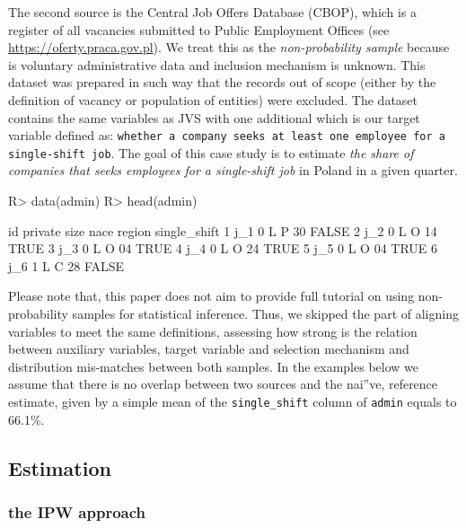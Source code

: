 \documentclass[
]{jss}
\begin{document}
The second source is the Central Job Offers Database (CBOP), which is a
register of all vacancies submitted to Public Employment Offices (see
\url{https://oferty.praca.gov.pl}). We treat this as the
\textit{non-probability sample} because is voluntary administrative data
and inclusion mechanism is unknown. This dataset was prepared in such
way that the records out of scope (either by the definition of vacancy
or population of entities) were excluded. The dataset contains the same
variables as JVS with one additional  which is our
target variable defined as:
\texttt{whether a company seeks at least one employee for a single-shift job}.
The goal of this case study is to estimate
\textit{the share of companies that seeks employees for a single-shift job}
in Poland in a given quarter.

\begin{CodeChunk}
\begin{CodeInput}
R> data(admin)
R> head(admin)
\end{CodeInput}
\begin{CodeOutput}
   id private size nace region single_shift
1 j_1       0    L    P     30        FALSE
2 j_2       0    L    O     14         TRUE
3 j_3       0    L    O     04         TRUE
4 j_4       0    L    O     24         TRUE
5 j_5       0    L    O     04         TRUE
6 j_6       1    L    C     28        FALSE
\end{CodeOutput}
\end{CodeChunk}

Please note that, this paper does not aim to provide full tutorial on
using non-probability samples for statistical inference. Thus, we
skipped the part of aligning variables to meet the same definitions,
assessing how strong is the relation between auxiliary variables, target
variable and selection mechanism and distribution mis-matches between
both samples. In the examples below we assume that there is no overlap
between two sources and the nai''ve, reference estimate, given by a
simple mean of the \texttt{single\_shift} column of \texttt{admin}
equals to 66.1\%.

\subsection{Estimation}\label{estimation}

\subsubsection{the IPW approach}\label{the-ipw-approach}
\end{document}
